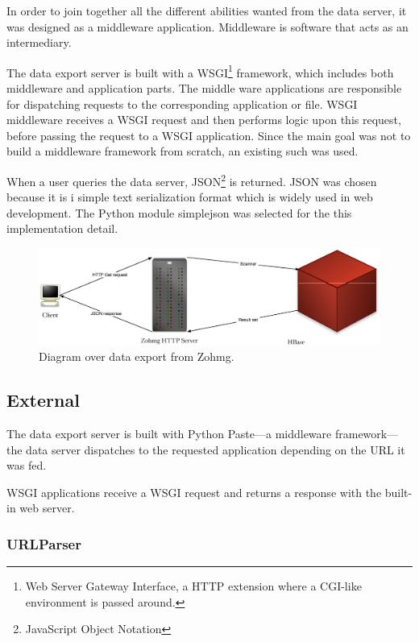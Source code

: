 In order to join together all the different abilities wanted from the data
server, it was designed as a middleware application. Middleware is software
that acts as an intermediary.

The data export server is built with a WSGI\footnote{Web Server Gateway
Interface, a HTTP extension where a CGI-like environment is passed around.}
framework, which includes both middleware and application parts. The middle
ware applications are responsible for dispatching requests to the corresponding
application or file. WSGI middleware receives a WSGI request and then performs
logic upon this request, before passing the request to a WSGI application.
\cite{paste,definitive_guide_to_pylons} Since the main goal was not to build a
middleware framework from scratch, an existing such was used.

When a user queries the data server, JSON\footnote{JavaScript Object Notation}
is returned. JSON was chosen because it is i simple text serialization format
which is widely used in web development. The Python module simplejson was
selected for the this implementation detail. \cite{simplejson}


\begin{figure}[h]
    \begin{center}
        \includegraphics[scale=0.35]{zohmg-export.eps}
        \caption{Diagram over data export from Zohmg.}
    \end{center}
\end{figure}


\subsection*{External}

The data export server is built with Python Paste---a middleware
framework---the data server dispatches to the requested application
depending on the URL it was fed. \cite{paste}

WSGI applications receive a WSGI request and returns a response with the
built-in web server.


\subsubsection{URLParser}

